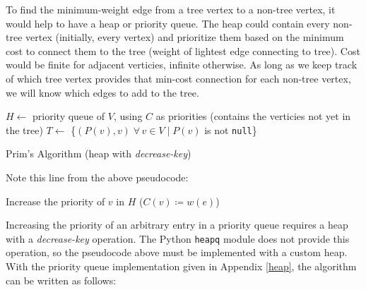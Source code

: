 \documentclass[12pt, titlepage]{article}
\begin{document}
To find the minimum-weight edge from a tree vertex to a non-tree vertex, it would help to have a heap or priority queue. The heap could contain every non-tree vertex (initially, every vertex) and prioritize them based on the minimum cost to connect them to the tree (weight of lightest edge connecting to tree). Cost would be finite for adjacent verticies, infinite otherwise. As long as we keep track of which tree vertex provides that min-cost connection for each non-tree vertex, we will know which edges to add to the tree. \\

\begin{algorithm}[H]
  \SetAlgoLined
  \DontPrintSemicolon
  $H \longleftarrow$\hspace{0.5mm} priority queue of $V$, using $C$ as priorities\;
  \hspace{13mm}(contains the verticies not yet in the tree)\;
  $T \longleftarrow$\hspace{0.5mm} \{$(P(v), v)\;\forall\,v\in V\mid P(v)$ is not \texttt{null}\}\;
  \;
  \caption{Prim's Algorithm (heap with \textit{decrease-key})}
\end{algorithm} \medskip

Note this line from the above pseudocode:
\begin{center}
Increase the priority of $v$ in $H$\hspace{4mm} ($C(v)\coloneqq w(e)$)
\end{center}
Increasing the priority of an arbitrary entry in a priority queue requires a heap with a \textit{decrease-key} operation. The Python \texttt{heapq} module does not provide this operation, so the pseudocode above must be implemented with a custom heap. With the priority queue implementation given in Appendix \ref{heap}, the algorithm can be written as follows: \medskip
\end{document}
